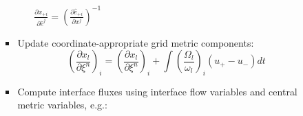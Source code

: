 \begin{itemize}
\begin{itemize}
\begin{itemize}
\begin{itemize}
          $\frac{{\partial {x_{ + i}}}}{{\partial {{\hat e}^j}}} = {\left( {\frac{{\partial {{\hat e}_{ + i}}}}{{\partial {x^j}}}} \right)^{ - 1}}$
        \end{itemize}
      \item Update coordinate-appropriate grid metric components:
        \[{\left( {\frac{{\partial {x_l}}}{{\partial {\xi ^n}}}} \right)_i} = {\left( {\frac{{\partial {x_l}}}{{\partial {\xi ^n}}}} \right)_i} + {\int {\left( {\frac{{{\Omega _l}}}{{{\omega _l}}}} \right)} _i}\left( {{u_ + } - {u_ - }} \right)dt\]
      \item Compute interface fluxes using interface flow variables and central metric variables, e.g.: 

\end{itemize}
\end{itemize}
\end{itemize}
